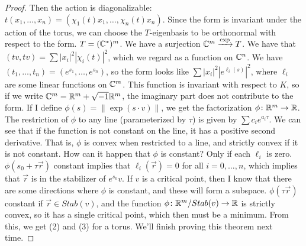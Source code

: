 \begin{proof}
 Then the action is diagonalizable: $t(x_1,\dots, x_n)=(\chi_1(t)x_1,\dots, \chi_n(t)x_n)$. Since the form is invariant under the action of the torus, we can choose the $T$-eigenbasis to be orthonormal with respect to the form. $T=(\mathbb{C}^*)^m$. We have a surjection $\mathbb{C}^m\xrightarrow\exp T$. We have that $(tv,tv)=\sum |x_i|^2 |\chi_i(t)|^2$, which we regard as a function on $\mathbb{C}^n$. We have $(t_1,\dots, t_n)=(e^{s_1},\dots, e^{s_n})$, so the form looks like $\sum |x_i|^2 |e^{\ell_i(s)}|^2$, where $\ell_i$ are some linear functions on $\mathbb{C}^m$. This function is invariant with respect to $K$, so if we write $\mathbb{C}^m=\mathbb{R}^m + \sqrt{-1}\mathbb{R}^m$, the imaginary part does not contribute to the form. If I define $\phi(s)=\|\exp(s\cdot v)\|$, we get the factorization $\phi\colon \mathbb{R}^m\to \mathbb{R}$. The restriction of $\phi$ to any line (parameterized by $\tau$) is given by $\sum c_i e^{a_i\tau}$. We can see that if the function is not constant on the line, it has a positive second derivative. That is, $\phi$ is convex when restricted to a line, and strictly convex if it is not constant. How can it happen that $\phi$ is constant? Only if each $\ell_i$ is zero. $\phi(s_0+\tau \vec r)$ constant implies that $\ell_i(\vec r)=0$ for all $i=0,\dots, n$, which implies that $\vec r$ is in the stabilizer of $e^{s_0}v$. If $v$ is a critical point, then I know that there are some directions where $\phi$ is constant, and these will form a subspace. $\phi(\tau\vec r)$ constant if $\vec r\in Stab(v)$, and the function $\phi\colon \mathbb{R}^m/Stab(v)\to \mathbb{R}$ is strictly convex, so it has a single critical point, which then must be a minimum. From this, we get (2) and (3) for a torus. We'll finish proving this theorem next time.


\end{proof}


